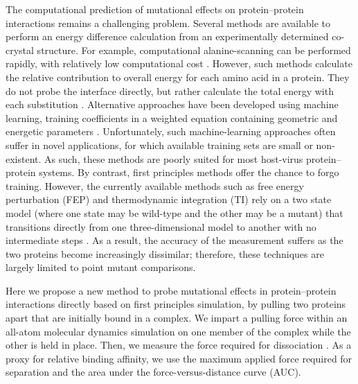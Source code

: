 \documentclass[12pt]{article} %
\providecommand{\DIFaddbegin}{} %
\providecommand{\DIFaddend}{} %
\providecommand{\DIFdelbegin}{} %
\providecommand{\DIFdelend}{} %
\begin{document}
The computational prediction of mutational effects on protein--protein interactions remains a challenging problem. Several methods are available to perform an energy difference calculation from an experimentally determined co-crystal structure. For example, computational alanine-scanning can be performed rapidly, with relatively low computational cost \DIFdelbegin %
\DIFdelend \DIFaddbegin \citep{Grant2011,Kortemme2004}\DIFaddend . However, such methods calculate the relative contribution to overall energy for each amino acid in a protein. They do not probe the interface directly, but rather calculate the total energy with each substitution \DIFdelbegin %
\DIFdelend \DIFaddbegin \citep{Grant2011,Kortemme2004}\DIFaddend . Alternative approaches have been developed using machine learning, training coefficients in a weighted equation containing geometric and energetic parameters \DIFdelbegin %
\DIFdelend \DIFaddbegin \citep{Vreven2011,Vreven2012,Bajaj2011,Hwang2010}\DIFaddend . Unfortunately, such machine-learning approaches often suffer in novel applications, for which available training sets are small or non-existent. As such, these methods are poorly suited for most host-virus protein--protein systems. By contrast, first principles methods offer the chance to forgo training. However, the currently available methods such as free energy perturbation (FEP) and thermodynamic integration (TI) rely on a two state model (where one state may be wild-type and the other may be a mutant) that transitions directly from one three-dimensional model to another with no intermediate steps \DIFdelbegin %
\DIFdelend \DIFaddbegin \citep{Gilson1997,Lu2004,Chodera2011,Gumbart2013}\DIFaddend . As a result, the accuracy of the measurement suffers as the two proteins become increasingly dissimilar; therefore, these techniques are largely limited to point mutant comparisons.

Here we propose a new method to probe mutational effects in protein--protein interactions directly based on first principles simulation, by pulling two proteins apart that are initially bound in a complex. We impart a pulling force within an all-atom molecular dynamics simulation on one member of the complex while the other is held in place. Then, we measure the force required for dissociation \DIFdelbegin %
\DIFdelend \DIFaddbegin \citep{Gumbart2012,Lu1999,Park2004,Is2001A,Is2001B}\DIFaddend . As a proxy for relative binding affinity, we use the maximum applied force required for separation and the area under the force-versus-distance curve (AUC). 
\end{document}
